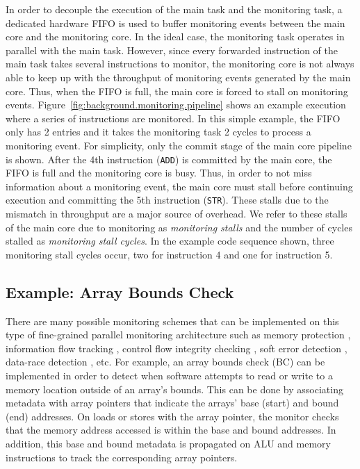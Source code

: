 In order to decouple the execution of the main task and the monitoring task, a
dedicated hardware FIFO is used to buffer monitoring events between the main
core and the monitoring core.  In the ideal case, the monitoring task operates
in parallel with the main task.  However, since 
every forwarded instruction of the main task
takes several instructions to monitor, the monitoring core is not always able to keep
up with the throughput of monitoring events generated by the main core.  Thus,
when the FIFO is full, the main core is forced to stall on monitoring events.
Figure~\ref{fig:background.monitoring.pipeline} shows an example
execution where a series of instructions are monitored. In this simple example,
the FIFO only has 2 entries and it takes the monitoring task 2 cycles to
process a monitoring event. For simplicity, only the commit stage of the main
core pipeline is shown.  After the 4th instruction ({\tt ADD}) is committed by
the main core, the FIFO is full and the monitoring core is busy. Thus, in order
to not miss information about a monitoring event, the main core must stall
before continuing execution and committing the 5th instruction ({\tt STR}).
These stalls due to the mismatch in throughput are a major source of overhead.
We refer to these stalls of the main core due to monitoring as \emph{monitoring
stalls} and the number of cycles stalled as \emph{monitoring stall cycles}. In
the example code sequence shown, three monitoring stall cycles occur, two for
instruction 4 and one for instruction 5.

\subsection{Example: Array Bounds Check}
\label{sec:background.monitoring.example}

There are many possible monitoring schemes that can be implemented on this type
of fine-grained parallel monitoring architecture such as memory protection
\cite{mondrian-asplos02}, information flow tracking \cite{dift-asplos04,
testudo-micro08}, control flow integrity checking \cite{hafix-dac15}, soft error
detection \cite{argus-micro07}, data-race
detection \cite{cord-hpca06, eraser-tocs97, literace-pldi09, pacer-pldi10},
etc.  For example, an array bounds check (BC) \cite{hardbound-asplos08} can be
implemented in order to detect when software attempts to read or write to a
memory location outside of an array's bounds. This can be done by associating
metadata with array pointers that indicate the arrays' base (start) and bound
(end) addresses. On loads or stores with the array pointer, the monitor checks
that the memory address accessed is within the base and bound addresses. In
addition, this base and bound metadata is propagated on ALU and memory
instructions to track the corresponding array pointers.

